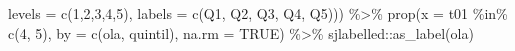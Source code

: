 \documentclass[
  12pt,
]{book}
\newenvironment{Shaded}{\begin{snugshade}}{\end{snugshade}}
\newcommand{\AttributeTok}[1]{\textcolor[rgb]{0.77,0.63,0.00}{#1}}
\newcommand{\ConstantTok}[1]{\textcolor[rgb]{0.00,0.00,0.00}{#1}}
\newcommand{\DecValTok}[1]{\textcolor[rgb]{0.00,0.00,0.81}{#1}}
\newcommand{\FunctionTok}[1]{\textcolor[rgb]{0.00,0.00,0.00}{#1}}
\newcommand{\NormalTok}[1]{#1}
\newcommand{\SpecialCharTok}[1]{\textcolor[rgb]{0.00,0.00,0.00}{#1}}
\newcommand{\StringTok}[1]{\textcolor[rgb]{0.31,0.60,0.02}{#1}}
\begin{document}
\begin{Shaded}
\begin{Highlighting}[]
                          \AttributeTok{levels =} \FunctionTok{c}\NormalTok{(}\DecValTok{1}\NormalTok{,}\DecValTok{2}\NormalTok{,}\DecValTok{3}\NormalTok{,}\DecValTok{4}\NormalTok{,}\DecValTok{5}\NormalTok{),}
                          \AttributeTok{labels =} \FunctionTok{c}\NormalTok{(}\StringTok{\textquotesingle{}Q1\textquotesingle{}}\NormalTok{, }\StringTok{\textquotesingle{}Q2\textquotesingle{}}\NormalTok{, }\StringTok{\textquotesingle{}Q3\textquotesingle{}}\NormalTok{, }\StringTok{\textquotesingle{}Q4\textquotesingle{}}\NormalTok{, }\StringTok{\textquotesingle{}Q5\textquotesingle{}}\NormalTok{))) }\SpecialCharTok{\%\textgreater{}\%} 
  \FunctionTok{prop}\NormalTok{(}\AttributeTok{x =}\NormalTok{ t01 }\SpecialCharTok{\%in\%} \FunctionTok{c}\NormalTok{(}\DecValTok{4}\NormalTok{, }\DecValTok{5}\NormalTok{), }\AttributeTok{by =} \FunctionTok{c}\NormalTok{(ola, quintil), }\AttributeTok{na.rm =} \ConstantTok{TRUE}\NormalTok{) }\SpecialCharTok{\%\textgreater{}\%} 
\NormalTok{  sjlabelled}\SpecialCharTok{::}\FunctionTok{as\_label}\NormalTok{(ola)}


\end{Highlighting}
\end{Shaded}
\end{document}
